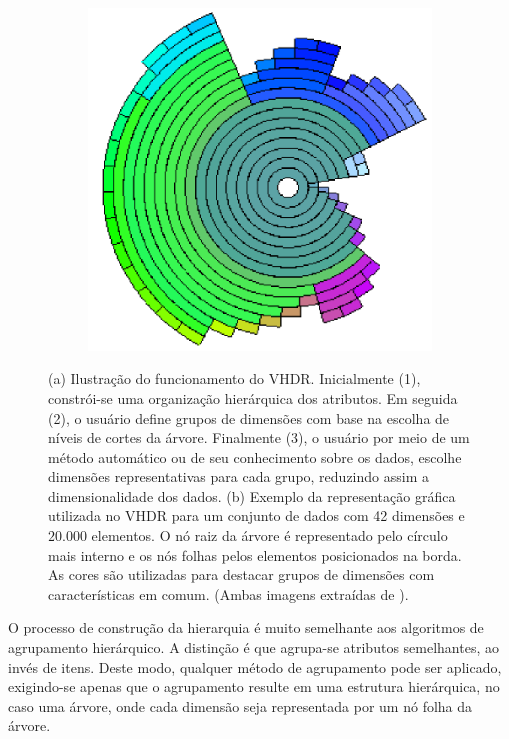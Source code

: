 \begin{figure}[h!]
\begin{subfigure}[b]{0.5\textwidth}
    \includegraphics[width=\textwidth]{images/vhdr2.png}
    \caption{}
    \label{fig:vhdr2}
  \end{subfigure} \caption[VHDR: Visual Hierarchical
  Dimension Reduction]{(a) Ilustração do funcionamento do
  VHDR.  Inicialmente (1), constrói-se uma organização
  hierárquica dos atributos. Em seguida (2), o usuário
  define grupos de dimensões com base na escolha de
  níveis de cortes da árvore. Finalmente (3), o usuário
  por meio de um método automático ou de seu
  conhecimento sobre os dados, escolhe dimensões
  representativas para cada grupo, reduzindo assim a
  dimensionalidade dos dados. (b) Exemplo da
  representação gráfica utilizada no VHDR para um
  conjunto de dados com 42 dimensões e $20.000$
  elementos. O nó raiz da árvore é representado pelo
  círculo mais interno e os nós folhas pelos elementos
  posicionados na borda. As cores são utilizadas para
  destacar grupos de dimensões com características em
  comum. (Ambas imagens extraídas de \cite{Yang2003}).}
\end{figure}

O processo de construção da hierarquia é muito semelhante
aos algoritmos de agrupamento hierárquico. A distinção é que
agrupa-se atributos semelhantes, ao invés de itens. Deste
modo, qualquer método de agrupamento pode ser aplicado,
exigindo-se apenas que o agrupamento resulte em uma
estrutura hierárquica, no caso uma árvore, onde cada
dimensão seja representada por um nó folha da árvore. 

